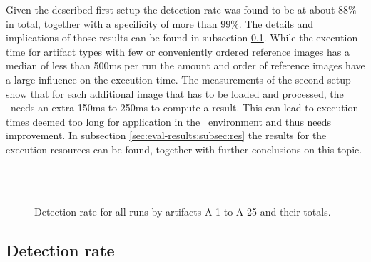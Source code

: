 Given the described first setup the detection rate was found to be at about $88\%$ in total, together with a specificity of more than $99\%$. The details and implications of those results can be found in subsection \ref{sec:eval-results:subsec:dect}. While the execution time for artifact types with few or conveniently ordered reference images has a median of less than 500ms per run the amount and order of reference images have a large influence on the execution time. The measurements of the second setup show that for each additional image that has to be loaded and processed, the \vd~needs an extra 150ms to 250ms to compute a result. This can lead to execution times deemed too long for application in the \ape~environment and thus needs improvement. In subsection \ref{sec:eval-results:subsec:res} the results for the execution resources can be found, together with further conclusions on this topic.

\begin{figure}[h!]
	\hfill\\
	\hfill\\
	\caption{Detection rate for all runs by artifacts A 1 to A 25 and their totals.}\label{fig:result-quality-sum}
\end{figure}

\subsection{Detection rate}\label{sec:eval-results:subsec:dect}

